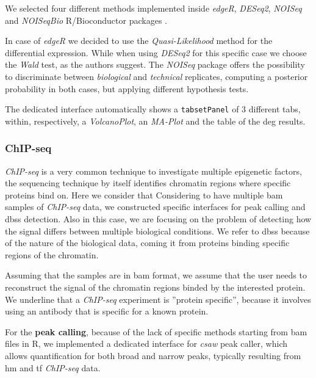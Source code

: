 We selected four different methods implemented inside \textit{edgeR}, \textit{DESeq2}, \textit{NOISeq} and \textit{NOISeqBio} R/Bioconductor packages \cite{Robinson2009, Love2014,Tarazona2012}.

In case of \textit{edgeR} we decided to use the \textit{Quasi-Likelihood} method for the differential expression.
While when using \textit{DESeq2} for this specific case we choose the \textit{Wald} test, as the authors suggest.
The \textit{NOISeq} package offers the possibility to discriminate between \textit{biological} and \textit{technical} replicates, computing a posterior probability in both cases, but applying different hypothesis tests.

The dedicated interface automatically shows a \lstinline!tabsetPanel! of 3 different tabs, within, respectively, a \textit{VolcanoPlot}, an \textit{MA-Plot} and the table of the \gls{deg} results.


\subsubsection{ChIP-seq} \label{sec:integrhochip}
\textit{ChIP-seq} is a very common technique to investigate multiple epigenetic factors, the sequencing technique by itself identifies chromatin regions where specific proteins bind on.
Here we consider that
Considering to have multiple \gls{bam} samples of \textit{ChIP-seq} data, we constructed specific interfaces for peak calling and \glspl{dbs} detection.
Also in this case, we are focusing on the problem of detecting how the signal differs between multiple biological conditions.
We refer to \glspl{dbs} because of the nature of the biological data, coming it from proteins binding specific regions of the chromatin.


Assuming that the samples are in \gls{bam} format, we assume that the user needs to reconstruct the signal of the chromatin regions binded by the interested protein.
We underline that a \textit{ChIP-seq} experiment is ''protein specific'', because it involves using an antibody that is specific for a known protein.

For the \textbf{peak calling}, because of the lack of specific methods starting from \gls{bam} files in R, we implemented a dedicated interface for \textit{csaw} \cite{Lun2015} peak caller, which allows quantification for both broad and narrow peaks, typically resulting from \gls{hm} and \gls{tf} \textit{ChIP-seq} data.

